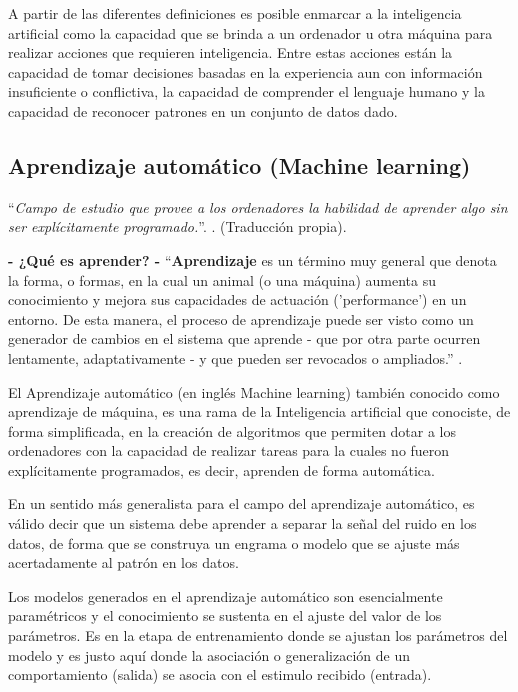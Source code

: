         A partir de las diferentes definiciones es posible enmarcar a la inteligencia artificial como la capacidad que se brinda a un ordenador u otra máquina para realizar acciones que requieren inteligencia. Entre estas acciones están la capacidad de tomar decisiones basadas en la experiencia aun con información insuficiente o conflictiva, la capacidad de comprender el lenguaje humano y la capacidad de reconocer patrones en un conjunto de datos dado.
    
    \subsection{Aprendizaje automático (Machine learning)}
    \label{sub:FrameMachineLearnig}
        
        ``\textit{Campo de estudio que provee a los ordenadores la habilidad de aprender algo sin ser explícitamente programado.}''. \cite{Samuel1959}.  (Traducción propia).
        
        \textbf{- ¿Qué es aprender? -} ``\textbf{Aprendizaje} es un término muy general que denota la forma, o formas, en la cual un animal (o una máquina) aumenta su conocimiento y mejora sus capacidades de actuación ('performance') en un entorno. De esta manera, el proceso de aprendizaje puede ser visto como un generador de cambios en el sistema que aprende - que por otra parte ocurren lentamente, adaptativamente - y que pueden ser revocados o ampliados.'' \cite[Pág. 6]{Moreno1994aprendizaje}.
        
        El Aprendizaje automático (en inglés Machine learning) también conocido como aprendizaje de máquina, es una rama de la Inteligencia artificial  que conociste, de forma simplificada, en la creación de algoritmos que permiten dotar a los ordenadores con la capacidad de realizar tareas para la cuales no fueron explícitamente programados, es decir, aprenden de forma automática. 
        
        En un sentido más generalista para el campo del aprendizaje automático, es válido decir que un sistema debe aprender a separar la señal del ruido en los datos, de forma que se construya un engrama  o  modelo que se ajuste más acertadamente al patrón en los datos.
            
        Los modelos generados en el aprendizaje automático son esencialmente paramétricos y el conocimiento se sustenta en el ajuste del valor de los parámetros. Es en la etapa de entrenamiento donde se ajustan los parámetros del modelo y es justo aquí donde la asociación o generalización de un comportamiento (salida) se asocia con el estimulo recibido (entrada).
        
